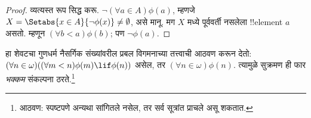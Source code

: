 \documentclass[../../../include/open-logic-section]{subfiles}
\begin{document}
\begin{proof}
व्यत्यस्त रूप सिद्ध करू. $\lnot(\forall a \in
A)\phi(a)$, म्हणजे $X = \Setabs{x \in A}{\lnot\phi(x)} \neq
\emptyset$, असे मानू. मग $X$ मध्ये पूर्ववर्ती नसलेला !!{element} $a$ असतो. म्हणून $(\forall
b < a)\phi(b)$; पण $\lnot \phi(a)$.
\end{proof}\noindent हा शेवटचा गुणधर्म नैसर्गिक संख्यांवरील प्रबल विगमनाच्या तत्त्वाची आठवण करून देतो: $(\forall n \in \omega)((\forall m < n)\phi(m)
\lif \phi(n))$ असेल, तर $(\forall n \in \omega)\phi(n)$. त्यामुळे सुक्रमण ही फार \emph{भक्कम} संकल्पना ठरते.\footnote{आठवण: स्पष्टपणे अन्यथा सांगितले नसेल, तर सर्व सूत्रांत प्राचले असू शकतात.}
\end{document}
